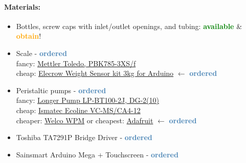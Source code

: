 \documentclass[12pt,a4paper]{scrartcl}
\newcommand{\ordered}[0]{\textcolor{steelblue}{\textbf{ordered}}}
\newcommand{\obtain}[0]{\textcolor{orange}{\textbf{obtain}}}
\newcommand{\avail}[0]{\textcolor{green}{\textbf{available}}}
\begin{document}
\paragraph{Materials:}
\begin{itemize}
\item Bottles, screw caps with inlet/outlet openings,
  and tubing: \avail{} \& \obtain{}!
\item Scale - \ordered{}\\
  fancy:
  \href{http://de.mt.com/de/de/home/products/Industrial_Weighing_Solutions/bench-scales/weighing-platforms/high-resolution/PBK785.html}{Mettler Toledo, PBK785-3XS/f}\\cheap:
  \href{http://www.elecrow.com/weight-sensor-kit-3kg-p-883.html}{Elecrow
    Weight Sensor kit 3kg for Arduino} $\leftarrow$ \ordered{}
\item Peristaltic pumps - \ordered{}\\ fancy:
  \href{http://www.drifton.dk/de/product/lp-bt100-2j-13/}{Longer Pump
    LP-BT100-2J, DG-2(10)}\\cheap:
  \href{http://www.ismatec.com/int_e/pumps/t_ecoline/ecomsca4.htm}{Ismatec
    Ecoline VC-MS/CA4-12}\\ cheaper: \href{Welco WPM}{Welco WPM} or
  cheapest: \href{https://www.adafruit.com/product/1150}{Adafruit}
  $\leftarrow$ \ordered{}
\item Toshiba TA7291P Bridge Driver - \ordered{}
\item Sainsmart Arduino Mega + Touchscreen - \ordered{}
\end{itemize}
\end{document}
